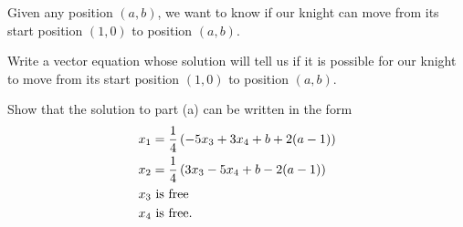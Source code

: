 \begin{pactivity} \label{act:knight_2} Given any position $(a,b)$, we want to know if our knight can move from its start position $(1,0)$ to position $(a,b)$. 
	\ba
	\item Write a vector equation whose solution will tell us if it is possible for our knight to move from its start position $(1,0)$ to position $(a,b)$. 

\begin{comment}

As in Project Activity \ref{act:knight_1}, an equation that tells us if this move is possible is
\[\left[ \begin{array}{c} 1\\0 \end{array} \right] + x_1 \vn_1 + x_2 \vn_2 + x_3 \vn_3 + x_4 \vn_4 = \left[ \begin{array}{c} a\\b \end{array} \right],\]
or
\[ x_1 \vn_1 + x_2 \vn_2 + x_3 \vn_3 + x_4 \vn_4 = \left[ \begin{array}{c} a-1\\b \end{array} \right].\]

\end{comment}

	\item Show that the solution to part (a) can be written in the form
	\begin{align}
	x_1 &= \frac{1}{4}\left(-5x_3+3x_4+b+2(a-1)\right) \label{eq:knight_x1} \\
	x_2 &= \frac{1}{4}\left(3x_3-5x_4+b-2(a-1)\right) \label{eq:knight_x2} \\
	x_3 &\text{ is free} \notag \\
	x_4 &\text{ is free.} \notag
	\end{align}

\begin{comment}

Using technology we see that the reduced row echelon form of 
\[\left[ \begin{array}{crcr|c} 1&-1&2&-2&a-1 \\ 2&2&1&1&b \end{array} \right]\]
is 
\[\left[ \renewcommand{\arraystretch}{1.4} \begin{array}{ccrr|r} 1&0&\frac{5}{4}&-\frac{3}{4}&\frac{1}{4}(b+2(a-1)) \\ 0&1&-\frac{3}{4}&\frac{5}{4}&\frac{1}{4}(b-2(a-1)) \end{array} \right].\]
This makes $x_3$ and $x_4 free, and 
\begin{align*}
x_1 &= -\frac{5}{4}x_3 + \frac{3}{4}x_4 + \frac{1}{4}(b+2(a-1)) = \frac{1}{4}\left( -5x_3 + 3x_4 + b + 2(a-1)\right) \\
x_2 &= \frac{3}{4}x_3 - \frac{5}{4}x_4 + \frac{1}{4}(b-2(a-1)) = \frac{1}{4}\left( 3x_3 - 5x_4 + b - 2(a-1) \right).
\end{align*}

\end{comment}

	\ea
\end{pactivity}

